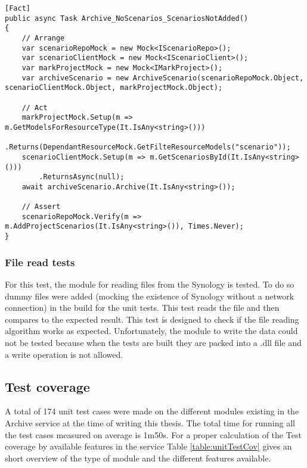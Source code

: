 \begin{lstlisting}[language={[Sharp]C}, caption={No scenarios added if resource empty}, captionpos=b,label={lst:scenarisEmpty}]
[Fact]
public async Task Archive_NoScenarios_ScenariosNotAdded()
{
    // Arrange
    var scenarioRepoMock = new Mock<IScenarioRepo>();
    var scenarioClientMock = new Mock<IScenarioClient>();
    var markProjectMock = new Mock<IMarkProject>();
    var archiveScenario = new ArchiveScenario(scenarioRepoMock.Object, scenarioClientMock.Object, markProjectMock.Object);
    
    // Act
    markProjectMock.Setup(m => m.GetModelsForResourceType(It.IsAny<string>()))
        .Returns(DependantResourceMock.GetFilteResourceModels("scenario"));
    scenarioClientMock.Setup(m => m.GetScenariosById(It.IsAny<string>()))
        .ReturnsAsync(null);
    await archiveScenario.Archive(It.IsAny<string>());                
    
    // Assert
    scenarioRepoMock.Verify(m => m.AddProjectScenarios(It.IsAny<string>()), Times.Never);
}
\end{lstlisting}

\subsubsection{File read tests}
For this test, the module for reading files from the Synology is tested. To do so dummy files were added (mocking the existence of Synology without 
a network connection) in the build for the unit tests. This test reads the file
and then compares to the expected result. This test is designed to check if the file reading algorithm works as expected. Unfortunately, the module to write the data
could not be tested because when the tests are built they are packed into a .dll file and a write operation is not allowed.

\subsection{Test coverage}
A total of 174 unit test cases were made on the different modules existing in the Archive service at the time of writing this thesis. The total time for running all 
the test cases measured on average is 1m50s. For a proper calculation of the Test coverage by available features in the service Table \ref{table:unitTestCov} gives an short
overview of the type of module and the different features available.

